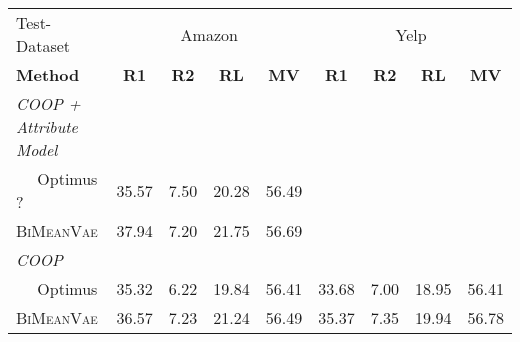 \begin{table}[!h]
  
    \centering
    \begin{tabular}{@{}lcccccccc@{}}
    \toprule
             Test-Dataset                  & \multicolumn{4}{c}{Amazon} & \multicolumn{4}{c}{Yelp} \\ 
    \textbf{Method} & \textbf{R1} & \textbf{R2} & \textbf{RL} & \textbf{MV} & \textbf{R1} & \textbf{R2} & \textbf{RL} & \textbf{MV}\\ \midrule
    
    \textit{COOP + Attribute Model}        &         &         &        &        &        &   & &     \\
    $\quad$ Optimus   ?         &   35.57   & 7.50  &  20.28 & 56.49 &     &         &   &    \\ 
    $\quad$ \textsc{BiMeanVae}   &   37.94  &   7.20    &  21.75 & 56.69&     &      &   &    \\ \midrule
    


    \textit{COOP}              &         &         &        &        &        & &   &    \\ %
    $\quad$ Optimus           & 35.32 &6.22 &19.84  & 56.41&  33.68& 7.00 &18.95 & 56.41\\ 
    $\quad$ \textsc{BiMeanVae}  & 36.57 &7.23 &21.24 & 56.49 & 35.37& 7.35 &19.94 & 56.78\\ \midrule
    

    

\end{tabular}
\end{table}
